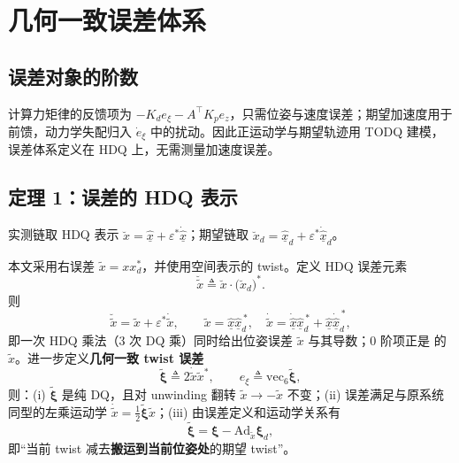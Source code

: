 \section{几何一致误差体系}

\subsection{误差对象的阶数}

计算力矩律的反馈项为 $-K_de_\xi-A^\top K_pe_z$，只需位姿与速度误差；期望加速度用于前馈，动力学失配归入 $\dot e_\xi$ 中的扰动。因此正运动学与期望轨迹用 TODQ 建模，误差体系定义在 HDQ 上，无需测量加速度误差。

\subsection{定理 1：误差的 HDQ 表示}

实测链取 HDQ 表示 $\breve x=\hat{\underline x}+\varepsilon^*\dot{\hat{\underline x}}$；期望链取 $\breve x_d=\hat{\underline x}_d+\varepsilon^*\dot{\hat{\underline x}}_d$。

\begin{theorem}\label{thm:1}
本文采用右误差 $\tilde x=x x_d^*$，并使用空间表示的 twist。定义 HDQ 误差元素
\begin{equation}
\breve{\tilde x}\triangleq \breve x\cdot\bigl(\breve x_d\bigr)^{*} .
\tag{4.1}\label{eq:4.1}
\end{equation}
则
\begin{equation}
\breve{\tilde x}=\tilde x+\varepsilon^*\dot{\tilde x},\qquad
\tilde x=\hat{\underline x}\hat{\underline x}_d^{\,*},\quad
\dot{\tilde x}=\dot{\hat{\underline x}}\hat{\underline x}_d^{\,*}+\hat{\underline x}\dot{\hat{\underline x}}_d^{\,*},
\tag{4.2}\label{eq:4.2}
\end{equation}
即一次 HDQ 乘法（3 次 DQ 乘）同时给出位姿误差 $\tilde x$ 与其导数；0 阶项正是 \cite{P2} 的 $\tilde x$。进一步定义\textbf{几何一致 twist 误差}
\begin{equation}
\tilde{\boldsymbol\xi}\triangleq 2\dot{\tilde x}\tilde x^{*},\qquad
e_\xi\triangleq\mathrm{vec}_6\tilde{\boldsymbol\xi},
\tag{4.3}\label{eq:4.3}
\end{equation}
则：(i) $\tilde{\boldsymbol\xi}$ 是纯 DQ，且对 unwinding 翻转 $\tilde x\to-\tilde x$ 不变；(ii) 误差满足与原系统同型的左乘运动学 $\dot{\tilde x}=\tfrac12\tilde{\boldsymbol\xi}\tilde x$；(iii) 由误差定义和运动学关系有
\begin{equation}
\tilde{\boldsymbol\xi}=\boldsymbol\xi-\mathrm{Ad}_{\tilde x}\boldsymbol\xi_d ,
\tag{4.4}\label{eq:4.4}
\end{equation}
即“当前 twist 减去\textbf{搬运到当前位姿处}的期望 twist”。
\end{theorem}

